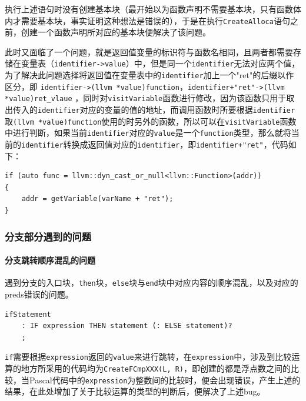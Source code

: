 \documentclass[lang=cn,11pt,a4paper,cite=authornum]{paper}
\begin{document}
执行上述语句时没有创建基本块（最开始以为函数声明不需要基本块，只有函数体内才需要基本块，事实证明这种想法是错误的），于是在执行\texttt{CreateAlloca}语句之前，创建一个函数声明所对应的基本块便解决了该问题。

​此时又面临了一个问题，就是返回值变量的标识符与函数名相同，且两者都需要存储在变量表（\texttt{identifier->value}）中，但是同一个\texttt{identifier}无法对应两个值，为了解决此问题选择将返回值在变量表中的\texttt{identifier}加上一个"ret"的后缀以作区分，即 \texttt{identifier->(llvm *value)function}，\texttt{identifier+"ret"->(llvm *value)ret_vlaue} ，同时对\texttt{visitVariable}函数进行修改，因为该函数只用于取出传入的\texttt{identifier}对应的变量的值的地址，而调用函数时所要根据\texttt{identifier}取\texttt{(llvm *value)function}使用的时另外的函数，所以可以在\texttt{visitVariable}函数中进行判断，如果当前\texttt{identifier}对应的\texttt{value}是一个\texttt{function}类型，那么就将当前的\texttt{identifier}转换成返回值对应的\texttt{identifier}，即\texttt{identifier+"ret"}，代码如下：

\begin{code}
\begin{verbatim}
if (auto func = llvm::dyn_cast_or_null<llvm::Function>(addr))
{
    addr = getVariable(varName + "ret");
}
\end{verbatim}
\end{code}

\subsubsection{分支部分遇到的问题}

\paragraph{分支跳转顺序混乱的问题}

遇到分支的入口块，\texttt{then}块，\texttt{else}块与\texttt{end}块中对应内容的顺序混乱，以及对应的preds错误的问题。

\begin{code}
\begin{verbatim}
ifStatement
    : IF expression THEN statement (: ELSE statement)?
    ;
\end{verbatim}
\end{code}

\texttt{if}需要根据\texttt{expression}返回的\texttt{value}来进行跳转，在\texttt{expression}中，涉及到比较运算的地方所采用的代码均为\texttt{CreateFCmpXXX(L, R)}，即创建的都是浮点数之间的比较，当Pascal代码中的\texttt{expression}为整数间的比较时，便会出现错误，产生上述的结果，在此处增加了关于比较运算的类型的判断后，便解决了上述bug。
\end{document}
